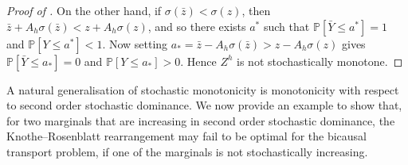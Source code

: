 \documentclass[onseside, final]{amsart}
\theoremstyle{definition}
\renewcommand{\P}{\mathbb P} %
\numberwithin{equation}{section}
\begin{document}
\begin{proof}[Proof of ]
			On the other hand, if $\sigma(\bar z) < \sigma(z)$, then $\bar z + A_h\sigma(\bar z) < z + A_h\sigma( z)$, and so there exists $a^\ast$ such that $\P[\bar Y \leq a^\ast] = 1$ and $\P[Y \leq a^\ast] < 1$. Now setting $a_\ast = \bar z - A_h \sigma(\bar z) > z - A_h\sigma(z)$ gives $\P[\bar Y \leq a_\ast] = 0$ and $\P[Y \le a_\ast] > 0$. Hence $Z^h$ is not stochastically monotone.
		\end{proof}
		
		A natural generalisation of stochastic monotonicity is monotonicity with respect to second order stochastic dominance. We now provide an example to show that, for two marginals that are increasing in second order stochastic dominance, the Knothe--Rosenblatt rearrangement may fail to be optimal for the bicausal transport problem, if one of the marginals is not stochastically increasing.
		
\end{document}
